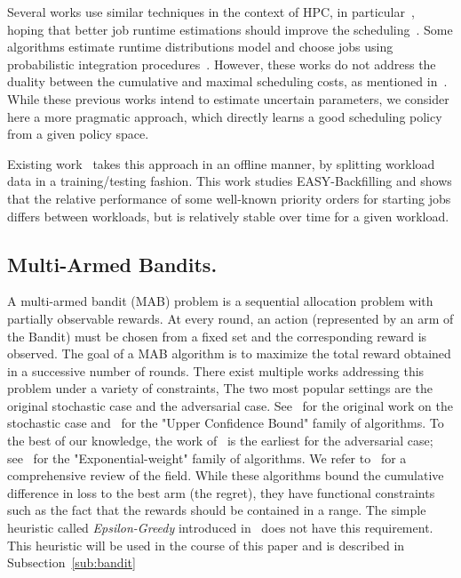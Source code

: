 \documentclass[sigconf,anonymous]{acmart}
\begin{document}
Several works use similar techniques in the context of HPC, in
particular~\cite{Tsafrir_easypp_2005,learningruntimes}, hoping that better job
runtime estimations should improve the scheduling~\cite{chiang_impact_2002}.
Some algorithms estimate runtime distributions model and choose jobs using
probabilistic integration procedures~\cite{Nissimov2008}.  However, these works
do not address the duality between the cumulative and maximal scheduling costs,
as mentioned in~\cite{learningruntimes}. While these previous works intend to
estimate uncertain parameters, we consider here a more pragmatic approach,
which directly learns a good scheduling policy from a given policy space.

Existing work~\cite{jsspp17} takes this approach in an offline manner, by
splitting workload data in a training/testing fashion. This work studies
EASY-Backfilling and shows that the relative performance of some well-known
priority orders for starting jobs differs between workloads, but is relatively
stable over time for a given workload.

\subsection{Multi-Armed Bandits.}

A multi-armed bandit (MAB) problem is a sequential allocation problem with
partially observable rewards. At every round, an action (represented by an arm
of the Bandit) must be chosen from a fixed set and the corresponding reward is
observed. The goal of a MAB algorithm is to maximize the total reward obtained
in a successive number of rounds. There exist multiple works addressing this
problem under a variety of constraints, The two most popular settings are the
original stochastic  case and the adversarial case. See~\cite{thompson} for the
original work on the stochastic case and~\cite{Auer2002} for the "Upper
Confidence Bound" family of algorithms. To the best of our knowledge, the work
of~\cite{Banos} is the earliest for the adversarial case; see~\cite{nonstoch}
for the "Exponential-weight" family of algorithms. We refer to~\cite{bubnow}
for a comprehensive review of the field. While these algorithms bound the
cumulative difference in loss to the best arm (the regret), they have
functional constraints such as the fact that the rewards should be contained in
a range. The simple heuristic called \textit{Epsilon-Greedy} introduced
in~\cite{Auer2002} does not have this requirement.  This heuristic will be used
in the course of this paper and is described in Subsection~\ref{sub:bandit}
\end{document}
